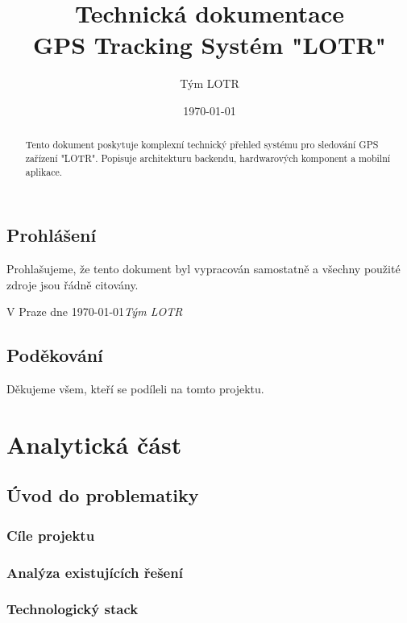 \documentclass[12pt, a4paper]{report}
\title{Technická dokumentace \\ GPS Tracking Systém "LOTR"}
\author{Tým LOTR}
\date{\today}
\begin{document}
\maketitle

\cleardoublepage
{}

\chapter*{Prohlášení}
Prohlašujeme, že tento dokument byl vypracován samostatně a všechny použité zdroje jsou řádně citovány.

\vspace*{2cm}
\noindent V Praze dne \today \hfill \textit{Tým LOTR}

\chapter*{Poděkování}
Děkujeme všem, kteří se podíleli na tomto projektu.

\begin{abstract}
Tento dokument poskytuje komplexní technický přehled systému pro sledování GPS zařízení "LOTR". Popisuje architekturu backendu, hardwarových komponent a mobilní aplikace.
\end{abstract}

\tableofcontents
\listoffigures
\listoftables

\cleardoublepage
{}



\part{Analytická část}
\chapter{Úvod do problematiky}
\section{Cíle projektu}
\section{Analýza existujících řešení}
\section{Technologický stack}
\end{document}
